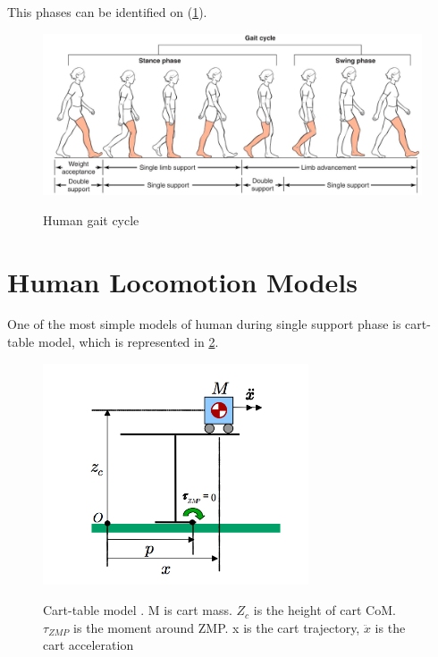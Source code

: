 \documentclass[12pt,a4paper]{report}
\begin{document}
			This phases can be identified on (\cref{fig:26}).
			 \begin{figure}[H]
			 	\vspace{-0.2cm}
			 	\centering
			 	{\includegraphics[width=1\textwidth]{26}}
			 	\caption{Human gait cycle \cite{gait}}
			 	\label{fig:26}
			 	\vspace{-0.1cm}
			 \end{figure}
			
		\section{Human Locomotion Models}
			One of the most simple models of human during single support phase is cart-table model, which is represented in \cref{fig:6}.
			
			\begin{figure}[H]
				\vspace{-0.2cm}
				\centering
				{\includegraphics[width=0.7\textwidth]{6}}
				\caption{Cart-table model \cite{kajita2003biped}. M is cart mass. $Z_c$ is the height of cart CoM. $\tau_{ZMP}$ is the moment around ZMP. x is the cart trajectory, $\ddot{x}$ is the cart acceleration}
				\label{fig:6}
				\vspace{-0.1cm}
			\end{figure}
			
\end{document}
